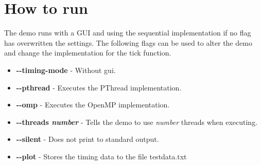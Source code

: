 \documentclass[a4paper,11pt]{article}
\begin{document}
\section{How to run}
The demo runs with a GUI and using the sequential implementation
if no flag has overwritten the settings. The following flags can be
used to alter the demo and change the implementation for the tick
function.
\begin{itemize}[label=,leftmargin=0pt]
\item \textbf{-\--timing-mode} - Without gui.
\item \textbf{-\--pthread} - Executes the PThread implementation.
\item \textbf{-\--omp} - Executes the OpenMP implementation.
\item \textbf{-\--threads \textit{number}} - Tells the demo to use
\textit{number} threads when executing.
\item \textbf{-\--silent} - Does not print to standard output.
\item \textbf{-\--plot} - Stores the timing data to the file testdata.txt
\end{itemize}
\end{document}

